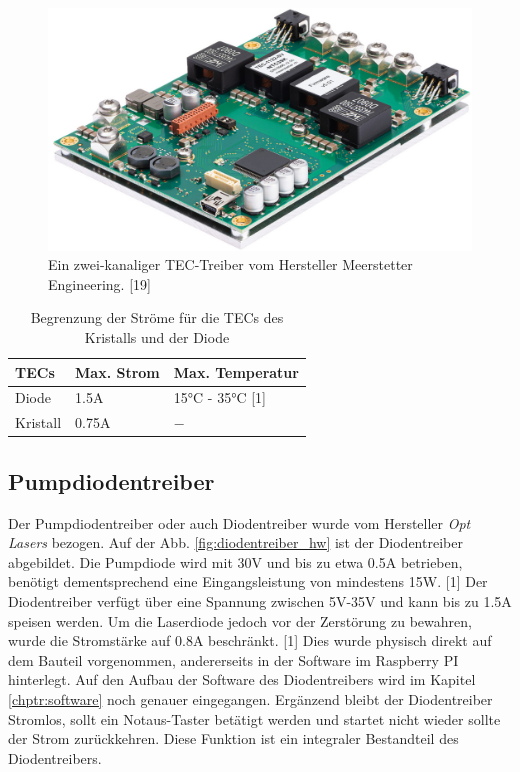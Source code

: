 \begin{figure}[H]
    \centering
    \includegraphics[scale=0.2]{98_images/tec_controller_real_isometry_meerstetter.PNG}
    \caption{Ein zwei-kanaliger TEC-Treiber vom Hersteller Meerstetter Engineering. [19]}
    \label{fig:tec_treiber_hw}
\end{figure}

\begin{table}[H]
    \centering
    \begin{tabular}{l|l|l}
         \textbf{TECs}& \textbf{Max. Strom}&    \textbf{Max. Temperatur} \\
         \hline
         Diode&         1.5A&                   15°C - 35°C [1]\\
         Kristall&      0.75A&                  $-$
    \end{tabular}
    \caption{Begrenzung der Ströme für die TECs des Kristalls und der Diode}
    \label{tab:tec_a_limit}
\end{table}

\subsection{Pumpdiodentreiber}
\label{chptr:_diodentreiber}
Der Pumpdiodentreiber oder auch Diodentreiber wurde vom Hersteller \textit{Opt Lasers} bezogen. Auf der Abb. \ref{fig:diodentreiber_hw} ist der Diodentreiber abgebildet. Die Pumpdiode wird mit 30V und bis zu etwa 0.5A betrieben, benötigt dementsprechend eine Eingangsleistung von mindestens 15W. [1] Der Diodentreiber verfügt über eine Spannung zwischen 5V-35V und kann bis zu 1.5A speisen werden. Um die Laserdiode jedoch vor der Zerstörung zu bewahren, wurde die Stromstärke auf 0.8A beschränkt. [1] Dies wurde physisch direkt auf dem Bauteil vorgenommen, andererseits in der Software im Raspberry PI hinterlegt. Auf den Aufbau der Software des Diodentreibers wird im Kapitel \ref{chptr:software} noch genauer eingegangen. Ergänzend bleibt der Diodentreiber Stromlos, sollt ein Notaus-Taster betätigt werden und startet nicht wieder sollte der Strom zurückkehren. Diese Funktion ist ein integraler Bestandteil des Diodentreibers.

